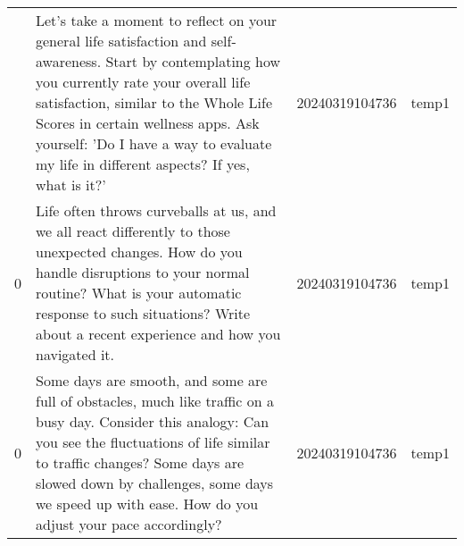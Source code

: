 \begin{longtable}{rlll}
\bottomrule
\endlastfoot
  0 &                                                                                                                                                                                                                                                                                                                                                                                                                                                                                                                                                                                                                                         Let's take a moment to reflect on your general life satisfaction and self-awareness. Start by contemplating how you currently rate your overall life satisfaction, similar to the Whole Life Scores in certain wellness apps. Ask yourself: 'Do I have a way to evaluate my life in different aspects? If yes, what is it?' & 20240319104736 &       temp1 \\
  0 &                                                                                                                                                                                                                                                                                                                                                                                                                                                                                                                                                                                                                                                                                                   Life often throws curveballs at us, and we all react differently to those unexpected changes. How do you handle disruptions to your normal routine? What is your automatic response to such situations? Write about a recent experience and how you navigated it. & 20240319104736 &       temp1 \\
  0 &                                                                                                                                                                                                                                                                                                                                                                                                                                                                                                                                                                                                                                                                   Some days are smooth, and some are full of obstacles, much like traffic on a busy day. Consider this analogy: Can you see the fluctuations of life similar to traffic changes? Some days are slowed down by challenges, some days we speed up with ease. How do you adjust your pace accordingly? & 20240319104736 &       temp1 \\

\end{longtable}
